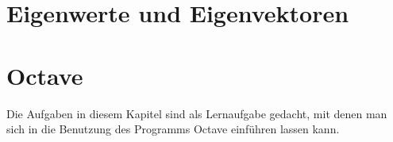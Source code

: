 \documentclass[a4paper,12pt]{book}
\begin{document}
\chapter{Eigenwerte und Eigenvektoren}

\chapter{Octave}
Die Aufgaben in diesem Kapitel sind als Lernaufgabe gedacht, mit denen
man sich in die Benutzung des Programms Octave einführen lassen kann.

\bigskip

\closethemaindex
\printthemata

\end{document}
